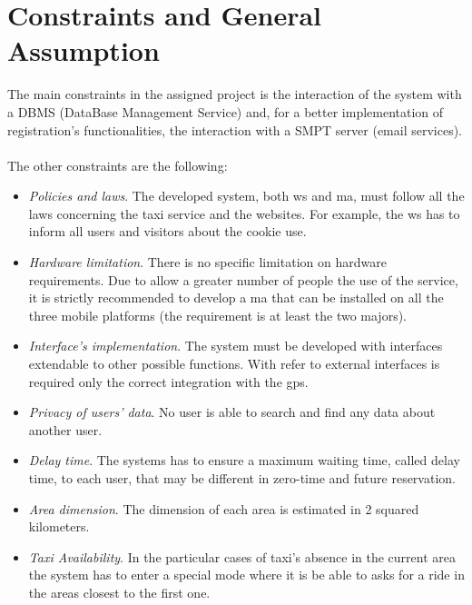\section{Constraints and General Assumption}
The main constraints in the assigned project is the interaction of the system with a DBMS (DataBase Management Service) and, for a better implementation of registration's functionalities, the interaction with a SMPT server (email services).\\
\\
The other constraints are the following:
\begin{itemize}
	\item \textit{Policies and laws}. The developed system, both \gls{ws} and \gls{ma}, must follow all the laws concerning the taxi service and the websites. For example, the \gls{ws} has to inform all \glspl{user} and visitors about the cookie use.
	\item \textit{Hardware limitation}. There is no specific limitation on hardware requirements. Due to allow a greater number of people the use of the service, it is strictly recommended to develop a \gls{ma} that can be installed on all the three mobile platforms (the requirement is at least the two majors).
	\item \textit{Interface's implementation}. The system must be developed with interfaces extendable to other possible functions. With refer to external interfaces is required only the correct integration with the \gls{gps}.
	\item \textit{Privacy of \glspl{user}' data}. No \gls{user} is able to search and find any data about another \gls{user}.
	\item \textit{Delay time}. The systems has to ensure a maximum waiting time, called delay time, to each \gls{user}, that may be different in zero-time and \gls{future} \gls{reservation}.
	\item \textit{Area dimension}. The dimension of each area is estimated in 2 squared kilometers.
	\item \textit{Taxi Availability}. In the particular cases of taxi's absence in the current area the system has to enter a special mode where it is be able to asks for a \gls{ride} in the areas closest to the first one.
\end{itemize}

